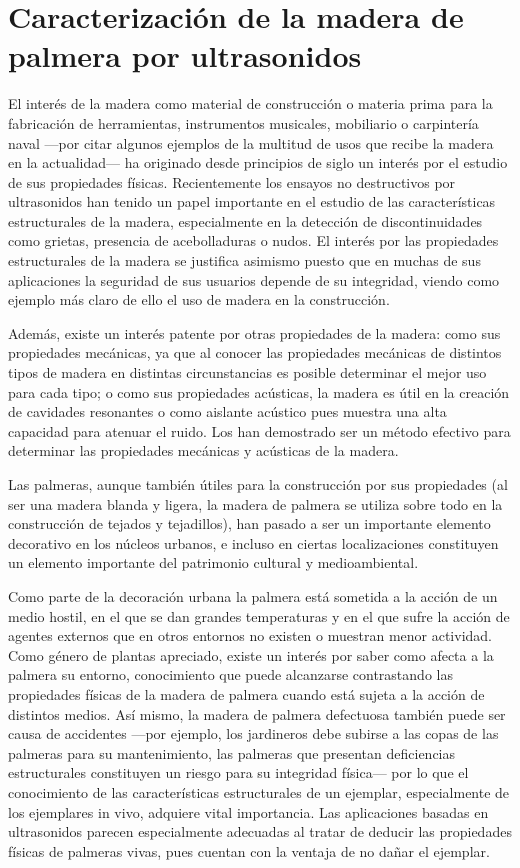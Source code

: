 \chapter{Caracterización de la madera de palmera por ultrasonidos}

El interés de la madera como material de construcción o materia prima para
la fabricación de herramientas, instrumentos musicales, mobiliario o
carpintería naval ---por citar algunos ejemplos de la multitud de usos que
recibe la madera en la actualidad--- ha originado desde principios de siglo
un interés por el estudio de sus propiedades físicas. Recientemente los
ensayos no destructivos por ultrasonidos han tenido un papel importante en
el estudio de las características estructurales de la madera, especialmente
en la detección de discontinuidades como grietas, presencia de
acebolladuras o nudos. El interés por las propiedades estructurales de la
madera se justifica asimismo puesto que en muchas de sus aplicaciones la
seguridad de sus usuarios depende de su integridad, viendo como ejemplo más
claro de ello el uso de madera en la construcción.

Además, existe un interés patente por otras propiedades de la madera: como
sus propiedades mecánicas, ya que al conocer las propiedades mecánicas de
distintos tipos de madera en distintas circunstancias es posible determinar
el mejor uso para cada tipo; o como sus propiedades acústicas, la madera es
útil en la creación de cavidades resonantes o como aislante acústico pues
muestra una alta capacidad para atenuar el ruido. Los  han
demostrado ser un método efectivo para determinar las propiedades mecánicas
y acústicas de la madera.

Las palmeras, aunque también útiles para la construcción por sus
propiedades (al ser una madera blanda y ligera, la madera de palmera se
utiliza sobre todo en la construcción de tejados y tejadillos), han pasado
a ser un importante elemento decorativo en los núcleos urbanos, e incluso
en ciertas localizaciones constituyen un elemento importante del patrimonio
cultural y medioambiental.

Como parte de la decoración urbana la palmera está sometida a la acción de
un medio hostil, en el que se dan grandes temperaturas y en el que sufre la
acción de agentes externos que en otros entornos no existen o muestran
menor actividad. Como género de plantas apreciado, existe un interés por
saber como afecta a la palmera su entorno, conocimiento que puede
alcanzarse contrastando las propiedades físicas de la madera de palmera
cuando está sujeta a la acción de distintos medios. Así mismo, la madera de
palmera defectuosa también puede ser causa de accidentes ---por ejemplo,
los jardineros debe subirse a las copas de las palmeras para su
mantenimiento, las palmeras que presentan deficiencias estructurales
constituyen un riesgo para su integridad física--- por lo que el
conocimiento de las características estructurales de un ejemplar,
especialmente de los ejemplares in vivo, adquiere vital importancia. Las
aplicaciones basadas en ultrasonidos parecen especialmente adecuadas al
tratar de deducir las propiedades físicas de palmeras vivas, pues cuentan
con la ventaja de no dañar el ejemplar.


